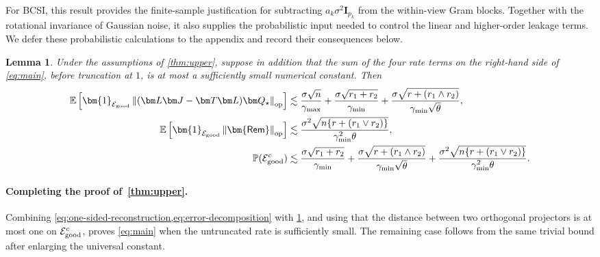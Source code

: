 \documentclass[11pt]{article}
\newtheorem{lemma}{Lemma}
\newcommand{\ind}{\bm{1}}
\newcommand{\opn}[1]{\left\lVert #1\right\rVert_{\mathrm{op}}}
\newcommand{\cE}{\mathcal{E}}
\begin{document}
For BCSI, this result provides the finite-sample justification for subtracting
$a_k\sigma^2\bm I_{p_k}$ from the within-view Gram blocks. Together with the
rotational invariance of Gaussian noise, it also supplies the probabilistic
input needed to control the linear and higher-order leakage terms.  We defer these probabilistic calculations to the appendix and
record their consequences below.

\begin{lemma}
\label{lem:stochastic-master}
Under the assumptions of \cref{thm:upper}, suppose in addition that the sum
of the four rate terms on the right-hand side of \cref{eq:main}, before
truncation at $1$, is at most a sufficiently small numerical constant.
Then
\begin{subequations}
\begin{align}
  \mathbb E\left[
    \ind_{\cE_{\rm good}}
    \opn{(\bm L\bm J-\bm T\bm L)\bm Q_\star}
  \right]
  &\lesssim
  \frac{\sigma\sqrt n}{\gamma_{\max}}
  +
  \frac{\sigma\sqrt{r_1+r_2}}{\gamma_{\min}}
  +
  \frac{
    \sigma\sqrt{r+ (r_1\wedge r_2)}
  }{
    \gamma_{\min}\sqrt\theta
  },
  \label{eq:first-order-expectation}\\
  \mathbb E\left[
    \ind_{\cE_{\rm good}}
    \opn{\bm{\mathsf{Rem}}}
  \right]
  &\lesssim
  \frac{
    \sigma^2\sqrt{n\{r+(r_1\vee r_2)\}}
  }{
    \gamma_{\min}^2\theta
  },
  \label{eq:higher-order-expectation}\\
  \mathbb P(\cE_{\rm good}^c)
  &\lesssim
  \frac{\sigma\sqrt{r_1+r_2}}{\gamma_{\min}}
  +
  \frac{
    \sigma\sqrt{r+ (r_1\wedge r_2)}
  }{
    \gamma_{\min}\sqrt\theta
  }
  +
  \frac{
    \sigma^2\sqrt{n\{r+(r_1\vee r_2)\}}
  }{
    \gamma_{\min}^2\theta
  }. \label{eq:G-complement}
\end{align}
\end{subequations}

\end{lemma}

\paragraph{Completing the proof of~\cref{thm:upper}.}
Combining
\cref{eq:one-sided-reconstruction,eq:error-decomposition}
with \cref{lem:stochastic-master}, and using that the distance between two
orthogonal projectors is at most one on $\cE_{\rm good}^c$, proves
\cref{eq:main} when the untruncated rate is sufficiently small.  The
remaining case follows from the same trivial bound after enlarging the
universal constant.
\end{document}
